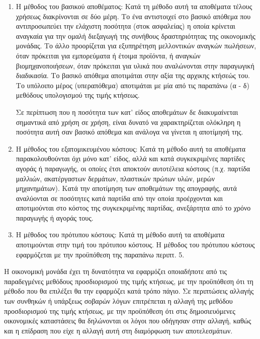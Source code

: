 \documentclass[A4,10pt,greek]{book}
\begin{document}
\begin{enumerate}
\begin{enumerate}
\item Η μέθοδος του βασικού αποθέματος: Κατά τη μέθοδο αυτή τα αποθέματα τέλους χρήσεως διακρίνονται σε δύο μέρη. Το ένα αντιστοιχεί στο βασικό απόθεμα που αντιπροσωπεύει την ελάχιστη ποσότητα (στοκ ασφαλείας) η οποία κρίνεται αναγκαία για την ομαλή διεξαγωγή της συνήθους δραστηριότητας της οικονομικής μονάδας. Το άλλο προορίζεται για εξυπηρέτηση μελλοντικών αναγκών πωλήσεων, όταν πρόκειται για εμπορεύματα ή έτοιμα προϊόντα, ή αναγκών βιομηχανοποιήσεων, όταν πρόκειται για υλικά που αναλώνονται στην παραγωγική διαδικασία. Το βασικό απόθεμα αποτιμάται στην αξία της αρχικης κτήσεώς του. Το υπόλοιπο μέρος (υπεραπόθεμα) αποτιμάται με μία από τις παραπάνω (α - δ) μεθόδους υπολογισμού της τιμής κτήσεως.


Σε περίπτωση που η ποσότητα των κατ' είδος αποθεμάτων δε διακυμαίνεται σημαντικά από χρήση σε χρήση, είναι δυνατό να χαρακτηρίζεται ολόκληρη η ποσότητα αυτή σαν βασικό απόθεμα και ανάλογα να γίνεται η αποτίμησή της.

\item Η μέθοδος του εξατομικευμένου κόστους: Κατά τη μέθοδο αυτή τα αποθέματα παρακολουθούνται όχι μόνο κατ' είδος, αλλά και κατά συγκεκριμένες παρτίδες αγοράς ή παραγωγής, οι οποίες έτσι αποκτούν αυτοτέλεια κόστους (π.χ. παρτίδα μαλλιών, ακατέργαστων δερμάτων, πλαστικών πρώτων υλών, μερών μηχανημάτων). Κατά την αποτίμηση των αποθεμάτων της απογραφής, αυτά αναλύονται σε ποσότητες κατά παρτίδα από την οποία προέρχονται και αποτιμούνται στο κόστος της συγκεκριμένης παρτίδας, ανεξάρτητα από το χρόνο παραγωγής ή αγοράς τους.

\item Η μέθοδος του πρότυπου κόστους: Κατά τη μέθοδο αυτή τα αποθέματα αποτιμούνται στην τιμή του πρότυπου κόστους. Η μέθοδος του πρότυπου κόστους εφαρμόζεται με την προϋπόθεση της παραπάνω περιπτ. 5.

\end{enumerate}

Η οικονομική μονάδα έχει τη δυνατότητα να εφαρμόζει οποιαδήποτε από τις παραδεγμένες μεθόδους προσδιορισμού της τιμής κτήσεως, με την προϋπόθεση ότι τη μέθοδο που θα επιλέξει θα την εφαρμόζει κατά τρόπο πάγιο. Σε περιπτώσεις αλλαγής των συνθηκών ή υπάρξεως σοβαρών λόγων επιτρέπεται η αλλαγή της μεθόδου προσδιορισμού της τιμής κτήσεως, με την προϋπόθεση ότι στις δημοσιευόμενες οικονομικές καταστάσεις θα δηλώνονται οι λόγοι που οδήγησαν στην αλλαγή, καθώς και η επίδραση που είχε η αλλαγή αυτή στη διαμόρφωση των αποτελεσμάτων.


\end{enumerate}
\end{document}
